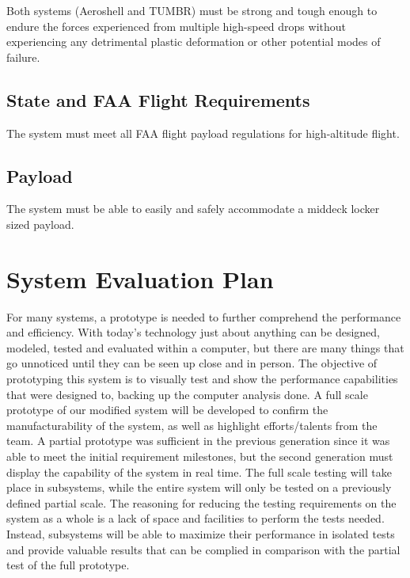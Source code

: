 \indent\indent Both systems (Aeroshell and TUMBR) must be strong and tough enough to endure the forces experienced from multiple high-speed drops without experiencing any detrimental plastic deformation or other potential modes of failure. 


\subsection{State and FAA Flight Requirements}

\indent\indent The system must meet all FAA flight payload regulations for high-altitude flight. 


\subsection{Payload}

\indent\indent The system must be able to easily and safely accommodate a middeck locker sized payload.


\section{System Evaluation Plan}

\indent\indent For many systems, a prototype is needed to further comprehend the performance and efficiency. With today's technology just about anything can be designed, modeled, tested and evaluated within a computer, but there are many things that go unnoticed until they can be seen up close and in person. The objective of prototyping this system is to visually test and show the performance capabilities that were designed to, backing up the computer analysis done. A full scale prototype of our modified system will be developed to confirm the manufacturability of the system, as well as highlight efforts/talents from the team. A partial prototype was sufficient in the previous generation since it was able to meet the initial requirement milestones, but the second generation must display the capability of the system in real time. The full scale testing will take place in subsystems, while the entire system will only be tested on a previously defined partial scale. The reasoning for reducing the testing requirements on the system as a whole is a lack of space and facilities to perform the tests needed. Instead, subsystems will be able to maximize their performance in isolated tests and provide valuable results that can be complied in comparison with the partial test of the full prototype. 

